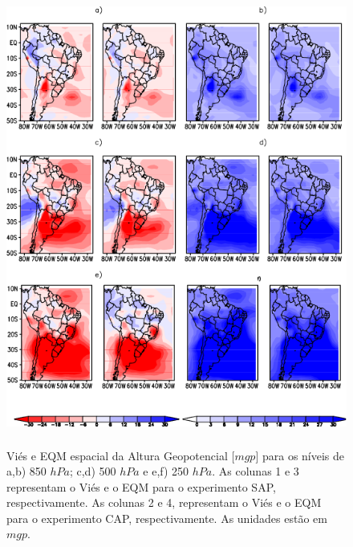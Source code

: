 \begin{figure}[!hbp]
\centering
\includegraphics[height=15cm]{./figs/campo_vies_eqm-zgeo.png}
\caption{Viés e EQM espacial da Altura Geopotencial [$mgp$] para os níveis de a,b) 850 $hPa$; c,d) 500 $hPa$ e e,f) 250 $hPa$. As colunas 1 e 3 representam o Viés e o EQM para o experimento SAP, respectivamente. As colunas 2 e 4, representam o Viés e o EQM para o experimento CAP, respectivamente. As unidades estão em $mgp$.}
\label{fig30b}
\end{figure}

